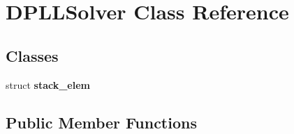 \hypertarget{classDPLLSolver}{\section{\-D\-P\-L\-L\-Solver \-Class \-Reference}
\label{classDPLLSolver}
}
\subsection*{\-Classes}
\begin{DoxyCompactItemize}
\item 
struct {\bfseries stack\-\_\-elem}
\end{DoxyCompactItemize}
\subsection*{\-Public \-Member \-Functions}
